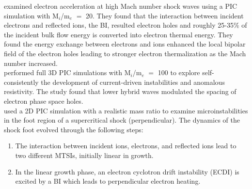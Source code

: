 \documentclass[grl]{AGUTeX}
\begin{document}
\begin{article}
\indent  \citet{shimada00a} examined electron acceleration at high Mach number shock waves using a PIC simulation with M${\scriptstyle_{i}}$/m${\scriptstyle_{e}}$ $=$ 20.  They found that the interaction between incident electrons and reflected ions, the BI, resulted electron holes and roughly 25-35$\%$ of the incident bulk flow energy is converted into electron thermal energy.  They found the energy exchange between electrons and ions enhanced the local bipolar field of the electron holes leading to stronger electron thermalization as the Mach number increased.  \\
\indent  \citet{drake03a} performed full 3D PIC simulations with M${\scriptstyle_{i}}$/m${\scriptstyle_{e}}$ $=$ 100 to explore self-consistently the development of current-driven instabilities and anomalous resistivity.  The study found that lower hybrid waves modulated the spacing of electron phase space holes.  \\
\indent  \citet{matsukiyo06b} used a 2D PIC simulation with a realistic mass ratio to examine microinstabilities in the foot region of a supercritical shock (perpendicular).  The dynamics of the shock foot evolved through the following steps:
\begin{enumerate}
  \item  The interaction between incident ions, electrons, and reflected ions lead to two different MTSIs, initially linear in growth.
  \item  In the linear growth phase, an electron cyclotron drift instability (ECDI) is excited by a BI which leads to perpendicular electron heating.

\end{enumerate}
\end{article}
\end{document}
